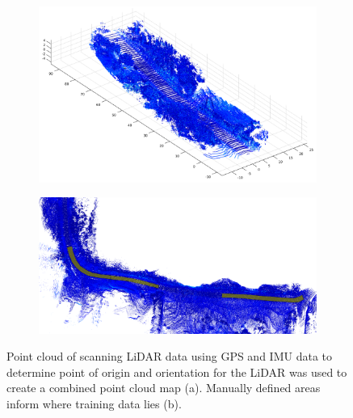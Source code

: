 \documentclass[journal,onecolumn]{IEEEtran}
\begin{document}
	\begin{figure}[H]
		\centering
		\begin{subfigure}{0.45\textwidth}
			\centering
			\includegraphics[width=0.95\linewidth]{figures/Compiled_PCD}
			\caption[C]{}
			\label{fig:Compiled_PCD}
		\end{subfigure}
		\begin{subfigure}{0.45\textwidth}
			\centering
			\includegraphics[width=0.95\linewidth]{figures/Manually_Defined_Area_Train_Dat_Grab_2}
			\caption[]{}
			\label{fig:Classified_Areas_PCD}
		\end{subfigure}
		\caption[Compiled and Classified Point Cloud Data]{Point cloud of scanning LiDAR data using GPS and IMU data to determine point of origin and orientation for the LiDAR was used to create a combined point cloud map (a). Manually defined areas inform where training data lies (b).}
		\label{fig:Combined_Classified_PCD}
	\end{figure}
	
\end{document}
